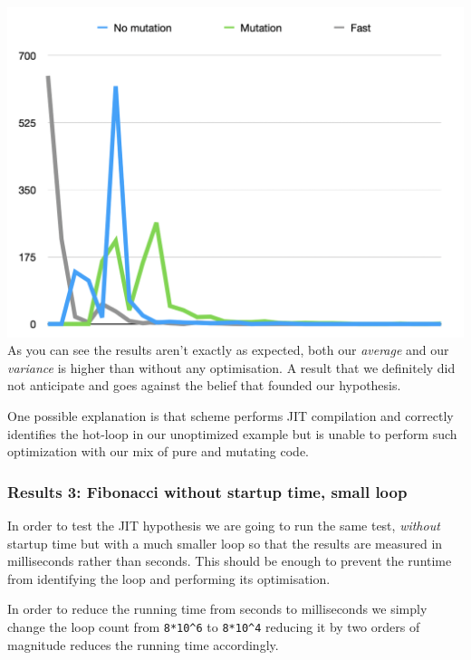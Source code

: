 \documentclass[
]{article}
\begin{document}
\includegraphics{Screenshot 2020-08-25 at 17.59.34.png} As you can see
the results aren't exactly as expected, both our \emph{average} and our
\emph{variance} is higher than without any optimisation. A result that
we definitely did not anticipate and goes against the belief that
founded our hypothesis.

One possible explanation is that scheme performs JIT compilation and
correctly identifies the hot-loop in our unoptimized example but is
unable to perform such optimization with our mix of pure and mutating
code.

\hypertarget{results-3-fibonacci-without-startup-time-small-loop}{%
\subsubsection{Results 3: Fibonacci without startup time, small
loop}\label{results-3-fibonacci-without-startup-time-small-loop}}

In order to test the JIT hypothesis we are going to run the same test,
\emph{without} startup time but with a much smaller loop so that the
results are measured in milliseconds rather than seconds. This should be
enough to prevent the runtime from identifying the loop and performing
its optimisation.

In order to reduce the running time from seconds to milliseconds we
simply change the loop count from \texttt{8*10\^{}6} to
\texttt{8*10\^{}4} reducing it by two orders of magnitude reduces the
running time accordingly.
\end{document}
